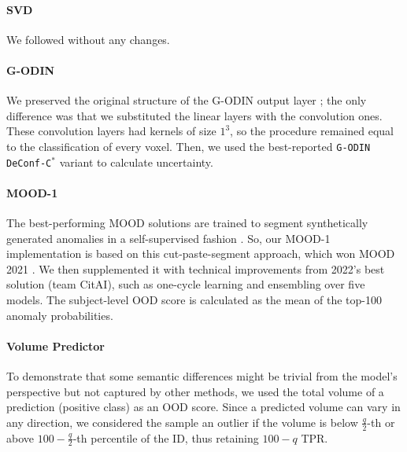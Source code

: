 \paragraph{SVD}
We followed \cite{karimi2022improving} without any changes.

\paragraph{G-ODIN}
We preserved the original structure of the G-ODIN output layer \cite{hsu2020generalized}; the only difference was that we substituted the linear layers with the convolution ones. These convolution layers had kernels of size $1^3$, so the procedure remained equal to the classification of every voxel. Then, we used the best-reported \texttt{G-ODIN DeConf-C$^*$} variant to calculate uncertainty. %


\paragraph{MOOD-1} The best-performing MOOD solutions are trained to segment synthetically generated anomalies in a self-supervised fashion \cite{zimmerer2022mood}. So, our MOOD-1 implementation is based on this cut-paste-segment approach, which won MOOD 2021 \cite{cho2021self}. We then supplemented it with technical improvements from 2022's best solution (team CitAI), such as one-cycle learning and ensembling over five models. The subject-level OOD score is calculated as the mean of the top-100 anomaly probabilities.

\paragraph{Volume Predictor} To demonstrate that some semantic differences might be trivial from the model's perspective but not captured by other methods, we used the total volume of a prediction (positive class) as an OOD score. Since a predicted volume can vary in any direction, we considered the sample an outlier if the volume is below $\frac{q}{2}$-th or above $100 - \frac{q}{2}$-th percentile of the ID, thus retaining $100 - q$ TPR.


